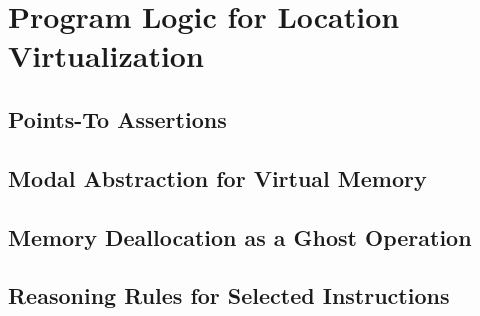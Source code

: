 \section{Program Logic for Location Virtualization}
\label{sec:logic}

\subsection{Points-To Assertions}
\label{sec:pointsto}



\subsection{Modal Abstraction for Virtual Memory}
\label{sec:credits}

\subsection{Memory Deallocation as a Ghost Operation}
\label{sec:free}

\subsection{Reasoning Rules for Selected Instructions}
\label{sec:reasoning}



